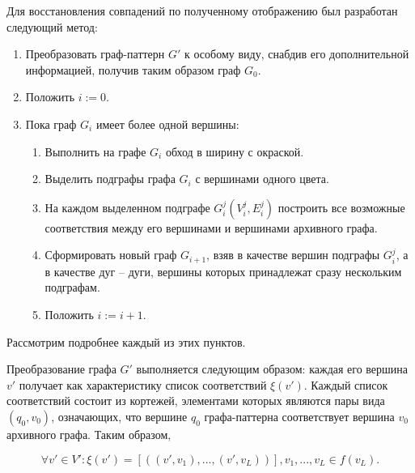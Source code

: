 Для восстановления совпадений по полученному отображению был разработан следующий метод:

\begin{enumerate}
	\item Преобразовать граф-паттерн $G'$ к особому виду, снабдив его дополнительной информацией, получив таким образом граф $G_0$.
	\item Положить $i := 0$.
	\item Пока граф $G_i$ имеет более одной вершины:
	\begin{enumerate}
		\item Выполнить на графе $G_i$ обход в ширину с окраской.
		\item Выделить подграфы графа $G_i$ с вершинами одного цвета.
		\item На каждом выделенном подграфе $G_i^j(V_i^j, E_i^j)$ построить все возможные соответствия между его вершинами и вершинами архивного графа.
		\item Сформировать новый граф $G_{i+1}$, взяв в качестве вершин подграфы $G_i^j$, а в качестве дуг -- дуги, вершины которых принадлежат сразу нескольким подграфам.
		\item Положить $i := i + 1$.
	\end{enumerate}
\end{enumerate}

Рассмотрим подробнее каждый из этих пунктов.

Преобразование графа $G'$ выполняется следующим образом: каждая его вершина $v'$ получает как характеристику список соответствий $\xi(v')$. Каждый список соответствий состоит из кортежей, элементами которых являются пары вида $(q_0, v_0)$, означающих, что вершине $q_0$ графа-паттерна соответствует вершина $v_0$ архивного графа. Таким образом,

\[\forall v' \in V': \xi(v') = [((v', v_1), ..., (v', v_L))], v_1, ..., v_L \in f(v_L).\]

